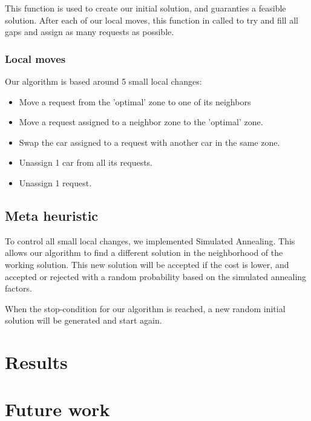 \documentclass[11pt]{article}
\begin{document}
            This function is used to create our initial solution, and guaranties a feasible solution.
            After each of our local moves, this function in called to try and fill all gaps and assign as many requests as possible.

        \subsubsection{Local moves}
            Our algorithm is based around 5 small local changes:
            \begin{itemize}
                \item Move a request from the 'optimal' zone to one of its neighbors
                \item Move a request assigned to a neighbor zone to the 'optimal' zone.
                \item Swap the car assigned to a request with another car in the same zone.
                \item Unassign 1 car from all its requests.
                \item Unassign 1 request.
            \end{itemize}

        \subsection{Meta heuristic}
            To control all small local changes, we implemented Simulated Annealing. 
            This allows our algorithm to find a different solution in the neighborhood of the working solution. 
            This new solution will be accepted if the cost is lower, and accepted or rejected with a random probability based on the simulated annealing factors.
            
            When the stop-condition for our algorithm is reached, a new random initial solution will be generated and start again.

\section{Results}

\section{Future work}
\end{document}
